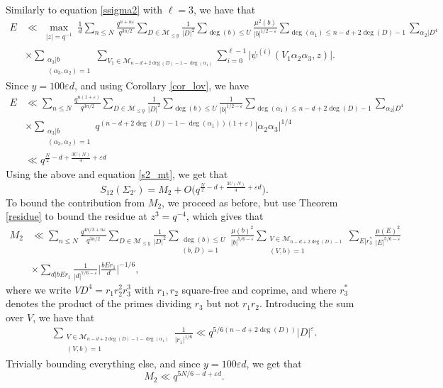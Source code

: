 \documentclass[12pt]{amsart}
\begin{document}
 Similarly to equation \eqref{ssigma2} with $\ell=3$, we have that
\begin{align*}
E & \ll \max_{\substack{|z|=q^{-1}}}  \frac{1}{d} \sum_{n \leq N} \frac{q^{n +n \varepsilon}}{q^{3n/2}} \sum_{D \in \mathcal{M}_{\leq y}} \frac{1}{|D|^2} \sum_{\deg(b) \leq U} \frac{\mu^2(b)}{|b|^{1/2-\varepsilon}} \sum_{\deg(\alpha_1) \leq n-d+2\deg(D)-1}  \sum_{\alpha_2 | D^{4}}  \nonumber \\
& \times \sum_{\substack{\alpha_3|b \\ (\alpha_3,\alpha_2)=1}} \sum_{V_1 \in \mathcal{M}_{n-d+2\deg(D)-1-\deg(\alpha_1)}}\sum_{i=0}^{\ell-1}  \Big| \psi^{(i)} (  V_1 \alpha_2 \alpha_3,z ) \Big|. %
\end{align*}
Since $y=100 \varepsilon d$, and using Corollary \ref{cor_lov}, we have
\begin{align*}
E & \ll \sum_{n \leq N} \frac{q^{n(1+\varepsilon)}}{q^{3n/2}} \sum_{D \in \mathcal{M}_{\leq y}} \frac{1}{|D|^2} \sum_{\deg(b) \leq U} \frac{1}{|b|^{1/2-\varepsilon}} \sum_{\deg(\alpha_1) \leq n-d+2\deg(D)-1}  \sum_{\alpha_2 | D^{4}}  \nonumber \\
& \times \sum_{\substack{\alpha_3|b \\ (\alpha_3,\alpha_2)=1}} q^{(n-d+2\deg(D)-1-\deg(\alpha_1))(1+\varepsilon)}   |\alpha_2 \alpha_3|^{1/4}  \nonumber \\
& \ll q^{\frac{N}{2}-d+\frac{3U(N)}{4}+\varepsilon d}
\end{align*}
Using the above and equation \eqref{s2_mt}, we get that
\begin{equation}
S_{12}(\Sigma_{2'}) = M_2 + O \Big( q^{\frac{N}{2}-d+\frac{3U(N)}{4}+\varepsilon d}\Big).
\label{s22'}
\end{equation}
To bound the contribution from $M_2$, we proceed as before, but use Theorem \ref{residue} to bound the residue at $z^3 = q^{-4}$, which gives that
\begin{align*}
M_2  & \ll \sum_{n \leq N} \frac{q^{4n/3+n \varepsilon}}{q^{3n/2}} \sum_{D \in \mathcal{M}_{\leq y}} \frac{1}{|D|^2} \sum_{\substack{\deg(b) \leq U  \\(b,D)=1}} \frac{\mu(b)^2}{|b|^{5/6-\varepsilon}} \sum_{\substack{V \in \mathcal{M}_{n-d+2\deg(D)-1} \\ (V,b)=1}} \sum_{E|r_3^{*}} \frac{\mu(E)^2}{|E|^{5/6-\varepsilon}} \\
& \times \sum_{d|bEr_1} \frac{1}{|d|^{7/6-\varepsilon}}  \Big| \frac{bEr_1}{d} \Big|^{-1/6},
\end{align*}
where we write $VD^4=r_1r_2^2r_3^3$ with $r_1, r_2$ square-free and coprime, and where $r_3^{*}$ denotes the product of the primes dividing $r_3$ but not $r_1r_2$. Introducing the sum over $V$, we have that
\begin{align*}
\sum_{\substack{V \in \mathcal{M}_{n-d+2\deg(D)-1-\deg(\alpha_1)} \\ (V,b)=1}} \frac{1}{|r_1|^{1/6}} \ll q^{5/6(n-d+2\deg(D))} |D|^{\varepsilon}.
\end{align*}
Trivially bounding everything else, and since $y=100\varepsilon d$, we get that
$$M_2 \ll q^{5N/6-d+\varepsilon d}.$$
\end{document}
